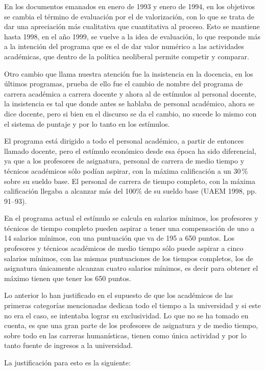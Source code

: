 En los documentos emanados en enero de 1993 y enero de 1994, en los
objetivos se cambia el término de evaluación por el de valorización, con lo
que se trata de dar una apreciación más cualitativa que cuantitativa al
proceso. Esto se mantiene hasta 1998, en el  año 1999, se vuelve a la idea
de evaluación, lo que responde más a la intención del programa que es el de
dar valor numérico a las actividades académicas, que dentro de la política
neoliberal permite competir y comparar.  


Otro cambio que llama nuestra atención fue la insistencia en la docencia, en
los  últimos programas, prueba de ello fue el cambio de nombre del programa
de carrera académica a carrera docente y ahora al de estímulos al personal
docente, la insistencia es tal que donde antes se hablaba de personal
académico, ahora se dice docente, pero si bien en el discurso se da el
cambio, no sucede lo mismo con el sistema de puntaje y por lo tanto en los
estímulos.


El programa está dirigido a todo el personal académico,  a partir de
entonces  llamado docente, pero el estímulo económico desde esa época ha
sido  diferencial, ya que a los profesores de asignatura, personal de
carrera de medio tiempo y técnicos académicos sólo podían aspirar, con la
máxima calificación a un 30\,\% sobre su sueldo base. El personal de carrera
de tiempo completo, con la máxima calificación llegaba a alcanzar más del
100\% de su sueldo base (UAEM 1998, pp. 91--93). 


En el programa actual el estímulo se calcula en salarios mínimos, los
profesores y técnicos de tiempo completo pueden aspirar a tener una
compensación  de uno a 14 salarios mínimos, con una puntuación que va de
195 a 650 puntos. Los profesores y técnicos académicos de medio tiempo sólo
puede aspirar a cinco salarios mínimos, con las mismas puntuaciones de los
tiempos completos, los de asignatura únicamente alcanzan cuatro salarios
mínimos, es decir para obtener el máximo tienen que tener los 650 puntos. 


 Lo anterior lo han  justificado en el supuesto de que los académicos de las
primeras categorías mencionadas dedican todo el tiempo a la universidad y
si este no era el caso,  se intentaba lograr su exclusividad. Lo que no se
ha tomado en cuenta, es que una gran parte de los profesores  de asignatura
y de medio tiempo, sobre todo en las carreras humanísticas, tienen como
única actividad y por lo tanto fuente de ingresos a la universidad.


La justificación para esto es la siguiente:


